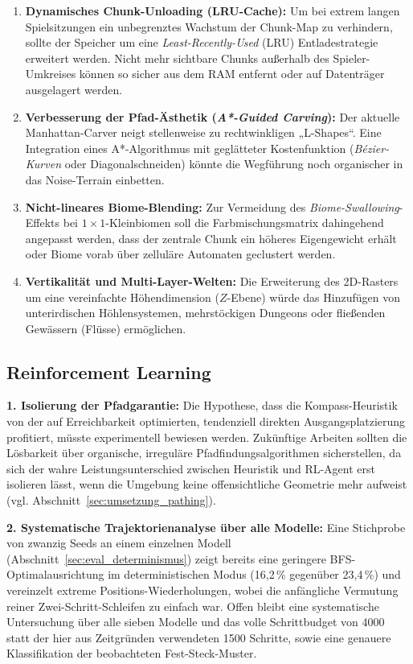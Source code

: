 \documentclass[
  a4paper,
  11pt,
  twoside,
  BCOR=8mm,           %
  headings=big,
  numbers=noenddot,
  listof=totoc,       %
  captions=tableheading,
]{scrreprt}
\begin{document}
\begin{enumerate}
    \item \textbf{Dynamisches Chunk-Unloading (LRU-Cache):} Um bei extrem langen Spielsitzungen ein unbegrenztes Wachstum der Chunk-Map zu verhindern, sollte der Speicher um eine \textit{Least-Recently-Used} (LRU) Entladestrategie erweitert werden. Nicht mehr sichtbare Chunks außerhalb des Spieler-Umkreises können so sicher aus dem RAM entfernt oder auf Datenträger ausgelagert werden.
    \item \textbf{Verbesserung der Pfad-Ästhetik (\textit{A*-Guided Carving}):} Der aktuelle Manhattan-Carver neigt stellenweise zu rechtwinkligen „L-Shapes“. Eine Integration eines A*-Algorithmus mit geglätteter Kostenfunktion (\textit{Bézier-Kurven} oder Diagonalschneiden) könnte die Wegführung noch organischer in das Noise-Terrain einbetten.
    \item \textbf{Nicht-lineares Biome-Blending:} Zur Vermeidung des \textit{Biome-Swallowing}-Effekts bei $1 \times 1$-Kleinbiomen soll die Farbmischungsmatrix dahingehend angepasst werden, dass der zentrale Chunk ein höheres Eigengewicht erhält oder Biome vorab über zelluläre Automaten geclustert werden.
    \item \textbf{Vertikalität und Multi-Layer-Welten:} Die Erweiterung des 2D-Rasters um eine vereinfachte Höhendimension ($Z$-Ebene) würde das Hinzufügen von unterirdischen Höhlensystemen, mehrstöckigen Dungeons oder fließenden Gewässern (Flüsse) ermöglichen.
\end{enumerate}

\subsection{Reinforcement Learning}
\label{sec:ausblick_rl}

\textbf{1. Isolierung der Pfadgarantie:} Die Hypothese, dass die Kompass-Heuristik von der auf Erreichbarkeit optimierten, tendenziell direkten Ausgangsplatzierung profitiert, müsste experimentell bewiesen werden. Zukünftige Arbeiten sollten die Lösbarkeit über organische, irreguläre Pfadfindungsalgorithmen sicherstellen, da sich der wahre Leistungsunterschied zwischen Heuristik und RL-Agent erst isolieren lässt, wenn die Umgebung keine offensichtliche Geometrie mehr aufweist (vgl. Abschnitt~\ref{sec:umsetzung_pathing}).

\textbf{2. Systematische Trajektorienanalyse über alle Modelle:} Eine Stichprobe von zwanzig Seeds an einem einzelnen Modell (Abschnitt~\ref{sec:eval_determinismus}) zeigt bereits eine geringere BFS-Optimalausrichtung im deterministischen Modus (16,2\,\% gegenüber 23,4\,\%) und vereinzelt extreme Positions-Wiederholungen, wobei die anfängliche Vermutung reiner Zwei-Schritt-Schleifen zu einfach war. Offen bleibt eine systematische Untersuchung über alle sieben Modelle und das volle Schrittbudget von 4000 statt der hier aus Zeitgründen verwendeten 1500 Schritte, sowie eine genauere Klassifikation der beobachteten Fest-Steck-Muster.
\end{document}
